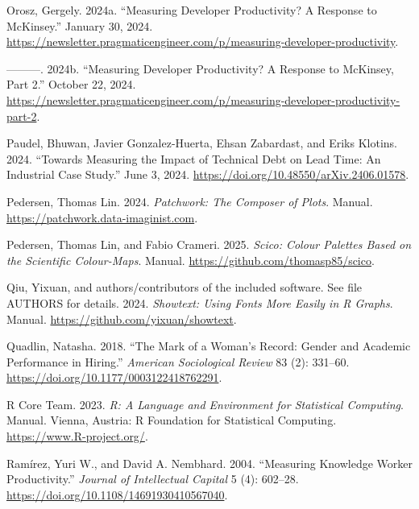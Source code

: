 \documentclass[
]{article}
\newlength{\cslhangindent}
\newenvironment{CSLReferences}[2] %
 {\begin{list}{}{%
  \setlength{\itemindent}{0pt}
  \setlength{\leftmargin}{0pt}
  \setlength{\parsep}{0pt}
  \ifodd #1
   \setlength{\leftmargin}{\cslhangindent}
   \setlength{\itemindent}{-1\cslhangindent}
  \fi
  \setlength{\itemsep}{#2\baselineskip}}}
 {\end{list}}
\begin{document}
\begin{CSLReferences}{1}{0}
Orosz, Gergely. 2024a. {``Measuring Developer Productivity? {A} Response
to {McKinsey}.''} January 30, 2024.
\url{https://newsletter.pragmaticengineer.com/p/measuring-developer-productivity}.

---------. 2024b. {``Measuring Developer Productivity? {A} Response to
{McKinsey}, {Part} 2.''} October 22, 2024.
\url{https://newsletter.pragmaticengineer.com/p/measuring-developer-productivity-part-2}.

Paudel, Bhuwan, Javier Gonzalez-Huerta, Ehsan Zabardast, and Eriks
Klotins. 2024. {``Towards {Measuring} the {Impact} of {Technical Debt}
on {Lead Time}: {An Industrial Case Study}.''} June 3, 2024.
\url{https://doi.org/10.48550/arXiv.2406.01578}.

Pedersen, Thomas Lin. 2024. \emph{Patchwork: {The} Composer of Plots}.
Manual. \url{https://patchwork.data-imaginist.com}.

Pedersen, Thomas Lin, and Fabio Crameri. 2025. \emph{Scico: {Colour}
Palettes Based on the Scientific Colour-Maps}. Manual.
\url{https://github.com/thomasp85/scico}.

Qiu, Yixuan, and authors/contributors of the included software. See file
AUTHORS for details. 2024. \emph{Showtext: {Using} Fonts More Easily in
{R} Graphs}. Manual. \url{https://github.com/yixuan/showtext}.

Quadlin, Natasha. 2018. {``The {Mark} of a {Woman}'s {Record}: {Gender}
and {Academic Performance} in {Hiring}.''} \emph{American Sociological
Review} 83 (2): 331--60. \url{https://doi.org/10.1177/0003122418762291}.

R Core Team. 2023. \emph{R: A Language and Environment for Statistical
Computing}. Manual. Vienna, Austria: R Foundation for Statistical
Computing. \url{https://www.R-project.org/}.

Ramírez, Yuri W., and David A. Nembhard. 2004. {``Measuring Knowledge
Worker Productivity.''} \emph{Journal of Intellectual Capital} 5 (4):
602--28. \url{https://doi.org/10.1108/14691930410567040}.


\end{CSLReferences}
\end{document}
